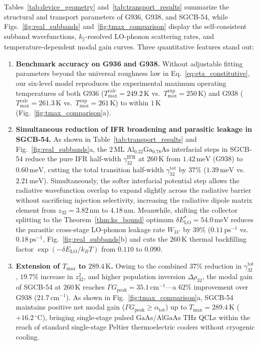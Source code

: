 \documentclass[11pt,letterpaper]{article}
\begin{document}
Tables~\ref{tab:device_geometry} and~\ref{tab:transport_results} summarize the structural and transport parameters of G936, G938, and SGCB-54, while Figs.~\ref{fig:real_subbands} and~\ref{fig:tmax_comparison} display the self-consistent subband wavefunctions, $k_\parallel$-resolved LO-phonon scattering rates, and temperature-dependent modal gain curves. Three quantitative features stand out:
\begin{enumerate}
    \item \textbf{Benchmark accuracy on G936 and G938.} Without adjustable fitting parameters beyond the universal roughness law in Eq.~\eqref{eq:eta_constitutive}, our six-level model reproduces the experimental maximum operating temperatures of both G936 ($T_{\max}^{\mathrm{calc}} = 249.2\,\mathrm{K}$ vs.\ $T_{\max}^{\mathrm{exp}} = 250\,\mathrm{K}$) and G938 ($T_{\max}^{\mathrm{calc}} = 261.3\,\mathrm{K}$ vs.\ $T_{\max}^{\mathrm{exp}} = 261\,\mathrm{K}$) to within $1\,\mathrm{K}$ (Fig.~\ref{fig:tmax_comparison}a).
    \item \textbf{Simultaneous reduction of IFR broadening and parasitic leakage in SGCB-54.} As shown in Table~\ref{tab:transport_results} and Fig.~\ref{fig:real_subbands}a, the $2\,\mathrm{ML}$ $\mathrm{Al}_{0.22}\mathrm{Ga}_{0.78}\mathrm{As}$ interfacial steps in SGCB-54 reduce the pure IFR half-width $\gamma_{32}^{\mathrm{IFR}}$ at $260\,\mathrm{K}$ from $1.42\,\mathrm{meV}$ (G938) to $0.60\,\mathrm{meV}$, cutting the total transition half-width $\gamma_{32}^{\mathrm{tot}}$ by $37\%$ ($1.39\,\mathrm{meV}$ vs.\ $2.21\,\mathrm{meV}$). Simultaneously, the softer interfacial potential step allows the radiative wavefunction overlap to expand slightly across the radiative barrier without sacrificing injection selectivity, increasing the radiative dipole matrix element from $z_{32} = 3.82\,\mathrm{nm}$ to $4.18\,\mathrm{nm}$. Meanwhile, shifting the collector splitting to the Theorem~\ref{thm:ks_bound} optimum $\delta E_{\mathrm{LO}}^* = 54.0\,\mathrm{meV}$ reduces the parasitic cross-stage LO-phonon leakage rate $W_{31'}$ by $39\%$ ($0.11\,\mathrm{ps}^{-1}$ vs.\ $0.18\,\mathrm{ps}^{-1}$, Fig.~\ref{fig:real_subbands}b) and cuts the $260\,\mathrm{K}$ thermal backfilling factor $\exp(-\delta E_{\mathrm{LO}}/k_B T)$ from $0.110$ to $0.090$.
    \item \textbf{Extension of $T_{\max}$ to $289.4\,\mathrm{K}$.} Owing to the combined $37\%$ reduction in $\gamma_{32}^{\mathrm{tot}}$, $19.7\%$ increase in $z_{32}^2$, and higher population inversion $\Delta\rho_{32}$, the modal gain of SGCB-54 at $260\,\mathrm{K}$ reaches $\Gamma G_{\mathrm{peak}} = 35.1\,\mathrm{cm}^{-1}$---a $62\%$ improvement over G938 ($21.7\,\mathrm{cm}^{-1}$). As shown in Fig.~\ref{fig:tmax_comparison}a, SGCB-54 maintains positive net modal gain ($\Gamma G_{\mathrm{peak}} \ge \alpha_{\mathrm{tot}}$) up to $T_{\max} = 289.4\,\mathrm{K}$ ($+16.2\,^\circ\mathrm{C}$), bringing single-stage pulsed $\mathrm{GaAs}/\mathrm{AlGaAs}$ THz QCLs within the reach of standard single-stage Peltier thermoelectric coolers without cryogenic cooling.
\end{enumerate}
\end{document}
